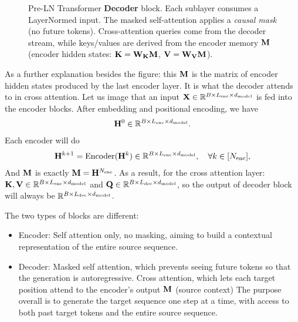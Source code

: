 \documentclass[11pt]{article}  %
\begin{document}
\begin{figure}[H]

\caption{Pre-LN Transformer \textbf{Decoder} block. Each sublayer consumes a LayerNormed input. The masked self-attention applies a \emph{causal mask} (no future tokens). Cross-attention queries come from the decoder stream, while keys/values are derived from the encoder memory $\mathbf{M}$ (encoder hidden states: $\mathbf{K}=\mathbf{W}_{\mathbf{K}}\mathbf{M}$, $\mathbf{V}=\mathbf{W}_{\mathbf{V}}\mathbf{M}$).}
\end{figure}

As a further explanation besides the figure: this $\mathbf{M}$ is the matrix of encoder hidden states produced by the last encoder layer. It is what the decoder attends to in cross attention.
Let us image that an input $\mathbf{X} \in \mathbb{R}^{B \times L_{\text{enc}} \times d_{\text{model}}}$ is fed into the encoder blocks. 
After embedding and positional encoding, we have 
\begin{align*}
  \mathbf{H}^0 \in \mathbb{R}^{B \times L_{\text{enc}} \times d_{\text{model}}}.
\end{align*}
Each encoder will do 
\begin{align*}
  \mathbf{H}^{k+1} = \text{Encoder}(\mathbf{H}^k) \in \mathbb{R}^{B \times L_{\text{enc}} \times d_{\text{model}}}, \quad \forall k \in [N_{\text{enc}}],
\end{align*}
And $\mathbf{M}$ is exactly $\mathbf{M} = \mathbf{H}^{N_{\text{enc}}}$.
As a result, for the cross attention layer: $\mathbf{K}, \mathbf{V} \in \mathbb{R}^{B \times L_{\text{enc}} \times d_{\text{model}}}$ and $\mathbf{Q} \in \mathbb{R}^{B \times L_{\text{dec}} \times d_{\text{model}}}$, so the output of decoder block will always be $\mathbb{R}^{B \times L_{\text{dec}} \times d_{\text{model}}}$.

The two types of blocks are different:
\begin{itemize}
  \item Encoder: Self attention only, no masking, aiming to build a contextual representation of the entire source sequence.
  
  \item Decoder: Masked self attention, which prevents seeing future tokens so that the generation is autoregressive. 
  Cross attention, which lets each target position attend to the encoder's output $\mathbf{M}$ (source context)
  The purpose overall is to generate the target sequence one step at a time, with access to both past target tokens and the entire source sequence.
\end{itemize}
\end{document}
